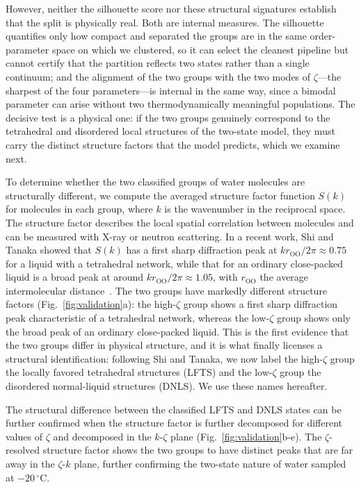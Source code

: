\documentclass[aps, amsmath,amssymb, reprint, twocolumn, superscriptaddress]{revtex4-2}
\begin{document}
However, neither the silhouette score nor these structural signatures establish that the split is physically real. Both are internal measures. The silhouette quantifies only how compact and separated the groups are in the same order-parameter space on which we clustered, so it can select the cleanest pipeline but cannot certify that the partition reflects two states rather than a single continuum; and the alignment of the two groups with the two modes of $\zeta$---the sharpest of the four parameters---is internal in the same way, since a bimodal parameter can arise without two thermodynamically meaningful populations. The decisive test is a physical one: if the two groups genuinely correspond to the tetrahedral and disordered local structures of the two-state model, they must carry the distinct structure factors that the model predicts, which we examine next.

To determine whether the two classified groups of water molecules are structurally different, we compute the averaged structure factor function $S(k)$ for molecules in each group, where $k$ is the wavenumber in the reciprocal space. The structure factor describes the local spatial correlation between molecules and can be measured with X-ray or neutron scattering. In a recent work, Shi and Tanaka showed that $S(k)$ has a first sharp diffraction peak at $kr_\text{OO}/2\pi \approx 0.75$ for a liquid with a tetrahedral network, while that for an ordinary close-packed liquid is a broad peak at around $kr_\text{OO}/2\pi \approx 1.05$, with $r_\text{OO}$ the average intermolecular distance~\cite{shi_direct_2020}. The two groups have markedly different structure factors (Fig.~\ref{fig:validation}a): the high-$\zeta$ group shows a first sharp diffraction peak characteristic of a tetrahedral network, whereas the low-$\zeta$ group shows only the broad peak of an ordinary close-packed liquid. This is the first evidence that the two groups differ in physical structure, and it is what finally licenses a structural identification: following Shi and Tanaka, we now label the high-$\zeta$ group the locally favored tetrahedral structures (LFTS) and the low-$\zeta$ group the disordered normal-liquid structures (DNLS). We use these names hereafter.

The structural difference between the classified LFTS and DNLS states can be further confirmed when the structure factor is further decomposed for different values of $\zeta$ and decomposed in the $k$-$\zeta$ plane (Fig.~\ref{fig:validation}b-e). The $\zeta$-resolved structure factor shows the two groups to have distinct peaks that are far away in the $\zeta$-$k$ plane, further confirming the two-state nature of water sampled at $-20\,^\circ$C.
\end{document}
